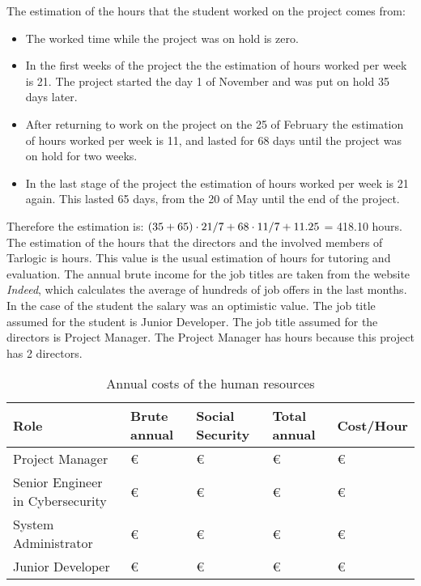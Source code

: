 \linej
The estimation of the hours that the student worked on the project comes from:
\begin{itemize}
	\item The worked time while the project was on hold is zero.
	\item In the first weeks of the project the the estimation of hours worked per week is 21. The project started the day 1 of November and was put on hold 35 days later.
	\item After returning to work on the project on the 25 of February the estimation of hours worked per week is 11, and lasted for 68 days until the project was on hold for two weeks.
	\item In the last stage of the project the estimation of hours worked per week is 21 again. This lasted 65 days, from the 20 of May until the end of the project.
\end{itemize}
\linej
Therefore the estimation is: $(35+65) \cdot 21/7 + 68 \cdot 11/7 + 11.25$ = 418.10 hours.
\linej
\linej
The estimation of the hours that the directors and the involved members of Tarlogic is \TutorHours hours.
This value is the usual estimation of hours for tutoring and evaluation.
\linej
\linej
The annual brute income for the job titles are taken from the website \textit{Indeed}\cite{indeed}, which calculates the average of hundreds of job offers in the last months.
In the case of the student the salary was an optimistic value.
\linej
The job title assumed for the student is Junior Developer.
The job title assumed for the directors is Project Manager.
The Project Manager has \ProjectManagerRoleHours hours because this project has 2 directors.
\linej
\begin{table}[H]
	\begin{tabularx}{\textwidth}{|X|l|l|l|l|}
		\hline
		\rowcolor{gray!30}
		Role                             & Brute annual                 & Social Security          &    Total annual             & Cost/Hour\\ \hline
		Project Manager                  & \ProjectManagerAnnual\euro{} & \ProjectManagerSC\euro{} & \ProjectManagerTotal\euro{} & \ProjectManagerHour\euro{}\\ \hline
		Senior Engineer in Cybersecurity & \SeniorEngineerAnnual\euro{} & \SeniorEngineerSC\euro{} & \SeniorEngineerTotal\euro{} & \SeniorEngineerHour\euro{}\\ \hline
		System Administrator             & \SysAdminAnnual\euro{}       & \SysAdminSC\euro{}       & \SysAdminTotal\euro{}       & \SysAdminHour\euro{}\\ \hline
		Junior Developer                 & \JuniorDeveloperAnnual\euro{}& \JuniorDeveloperSC\euro{}& \JuniorDeveloperTotal\euro{}& \JuniorDeveloperHour\euro{}\\ \hline
	\end{tabularx}
	\caption{Annual costs of the human resources}
\end{table}
